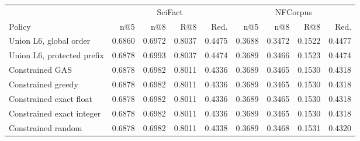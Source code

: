 \begin{tabular}{lrrrrrrrr}
\toprule
& \multicolumn{4}{c}{SciFact} & \multicolumn{4}{c}{NFCorpus}\\
Policy & n@5 & n@8 & R@8 & Red. & n@5 & n@8 & R@8 & Red.\\
\midrule
Union L6, global order & 0.6860 & 0.6972 & 0.8037 & 0.4475 & 0.3688 & 0.3472 & 0.1522 & 0.4477\\
Union L6, protected prefix & 0.6878 & 0.6993 & 0.8037 & 0.4474 & 0.3689 & 0.3466 & 0.1523 & 0.4474\\
Constrained GAS & 0.6878 & 0.6982 & 0.8011 & 0.4336 & 0.3689 & 0.3465 & 0.1530 & 0.4318\\
Constrained greedy & 0.6878 & 0.6982 & 0.8011 & 0.4336 & 0.3689 & 0.3465 & 0.1530 & 0.4318\\
Constrained exact float & 0.6878 & 0.6982 & 0.8011 & 0.4336 & 0.3689 & 0.3465 & 0.1530 & 0.4318\\
Constrained exact integer & 0.6878 & 0.6982 & 0.8011 & 0.4336 & 0.3689 & 0.3465 & 0.1530 & 0.4318\\
Constrained random & 0.6878 & 0.6982 & 0.8011 & 0.4338 & 0.3689 & 0.3468 & 0.1531 & 0.4320\\
\bottomrule
\end{tabular}
